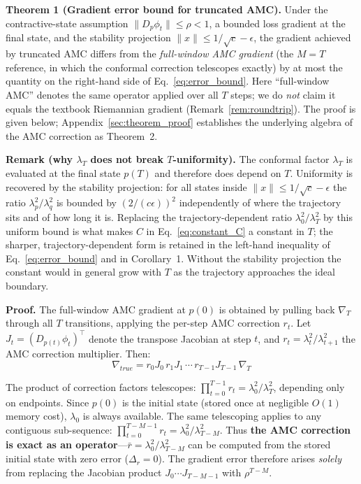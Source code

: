 \documentclass[a4paper,fleqn]{cas-dc}
\begin{document}
\textbf{Theorem 1 (Gradient error bound for truncated AMC).}
Under the contractive-state assumption $\|D_{p}\phi_t\|\le\rho<1$, a bounded loss gradient at the final state, and the stability projection $\|x\|\le 1/\sqrt{c}-\epsilon$, the gradient achieved by truncated AMC differs from the \emph{full-window AMC gradient} (the $M{=}T$ reference, in which the conformal correction telescopes exactly) by at most the quantity on the right-hand side of Eq.~\eqref{eq:error_bound}. Here ``full-window AMC'' denotes the same operator applied over all $T$ steps; we do \emph{not} claim it equals the textbook Riemannian gradient (Remark~\ref{rem:roundtrip}). The proof is given below; Appendix~\ref{sec:theorem_proof} establishes the underlying algebra of the AMC correction as Theorem~2.

\textbf{Remark (why $\lambda_T$ does not break $T$-uniformity).} The conformal factor $\lambda_T$ is evaluated at the final state $p(T)$ and therefore does depend on $T$. Uniformity is recovered by the stability projection: for all states inside $\|x\|\le 1/\sqrt{c}-\epsilon$ the ratio $\lambda_p^2/\lambda_q^2$ is bounded by $(2/(c\epsilon))^2$ independently of where the trajectory sits and of how long it is. Replacing the trajectory-dependent ratio $\lambda_0^2/\lambda_T^2$ by this uniform bound is what makes $C$ in Eq.~\eqref{eq:constant_C} a constant in $T$; the sharper, trajectory-dependent form is retained in the left-hand inequality of Eq.~\eqref{eq:error_bound} and in Corollary~1. Without the stability projection the constant would in general grow with $T$ as the trajectory approaches the ideal boundary.

\textbf{Proof.} The full-window AMC gradient at $p(0)$ is obtained by pulling back $\nabla_T$ through all $T$ transitions, applying the per-step AMC correction $r_t$. Let $J_t = (D_{p(t)}\phi_t)^\top$ denote the transpose Jacobian at step $t$, and $r_t = \lambda_t^2/\lambda_{t+1}^2$ the AMC correction multiplier. Then:
\begin{equation}
\nabla_{true} = r_0 J_0 \, r_1 J_1 \, \cdots \, r_{T-1} J_{T-1} \, \nabla_T
\end{equation}

The product of correction factors telescopes: $\prod_{t=0}^{T-1} r_t = \lambda_0^2/\lambda_T^2$, depending only on endpoints. Since $p(0)$ is the initial state (stored once at negligible $O(1)$ memory cost), $\lambda_0$ is always available. The same telescoping applies to any contiguous sub-sequence: $\prod_{t=0}^{T-M-1} r_t = \lambda_0^2/\lambda_{T-M}^2$. Thus \textbf{the AMC correction is exact as an operator}---$\bar{r} = \lambda_0^2/\lambda_{T-M}^2$ can be computed from the stored initial state with zero error ($\Delta_r = 0$). The gradient error therefore arises \textit{solely} from replacing the Jacobian product $J_0 \cdots J_{T-M-1}$ with $\rho^{T-M}$.
\end{document}
